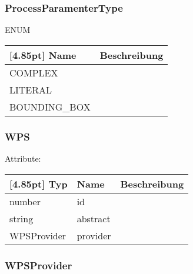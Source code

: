     		\subsubsection{ProcessParamenterType}
    		
    		ENUM
                \begin{center}
                	\renewcommand{\arraystretch}{1.5}
    	            \setlength\tabcolsep{5pt}
                	\begin{tabularx}{\textwidth}{|l|X|}
                		\hline
                        \rowcolor[gray]{0.75}[4.85pt]
                	    Name & Beschreibung \\ \hline
                		COMPLEX &   \\ \hline
                		LITERAL &   \\ \hline
                		BOUNDING_BOX  &  \\ \hline
                	\end{tabularx}
                \end{center}
                
    		\subsubsection{WPS}
    		
    		Attribute:
                \begin{center}
                	\renewcommand{\arraystretch}{1.5}
    	            \setlength\tabcolsep{5pt}
                	\begin{tabularx}{\textwidth}{|l|l|X|}
                		\hline
                        \rowcolor[gray]{0.75}[4.85pt]
                	    Typ & Name & Beschreibung \\ \hline
                		number & id &  \\ \hline
                		string & abstract &  \\ \hline
                		WPSProvider & provider &  \\ \hline
                	\end{tabularx}
                \end{center}
                
    		\subsubsection{WPSProvider}
    		

